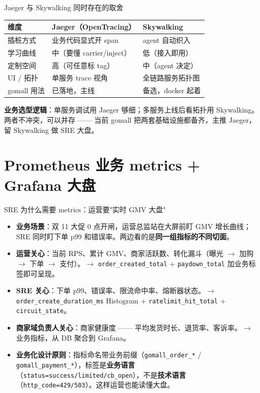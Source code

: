 \documentclass[aspectratio=169,11pt]{beamer}
\begin{document}
\begin{frame}[shrink]{Jaeger 与 Skywalking 同时存在的取舍}
\begin{tabular}{@{}p{2.0cm}p{4.8cm}p{4.0cm}@{}}
\toprule
维度 & Jaeger（OpenTracing） & Skywalking \\
\midrule
插桩方式   & 业务代码显式开 span    & agent 自动织入 \\
学习曲线   & 中（要懂 carrier/inject） & 低（接入即用） \\
定制空间   & 高（可任意标 tag）     & 中（agent 决定） \\
UI / 拓扑 & 单服务 trace 视角     & 全链路服务拓扑图 \\
gomall 用法 & 已落地，主线          & 备选，docker 起着 \\
\bottomrule
\end{tabular}

\medskip
{\small \textbf{业务选型逻辑}：单服务调试用 Jaeger 够细；多服务上线后看拓扑用 Skywalking。两者不冲突，可以并存 —— 当前 gomall 把两套基础设施都备齐，主推 Jaeger，留 Skywalking 做 SRE 大盘。}
\end{frame}

\section{Prometheus 业务 metrics + Grafana 大盘}

\begin{frame}[shrink]{SRE 为什么需要 metrics：运营要"实时 GMV 大盘"}
\begin{itemize}
  \item \textbf{业务场景}：双 11 大促 0 点开闸，运营总监站在大屏前盯 GMV 增长曲线；SRE 同时盯下单 p99 和错误率。两边看的是\textbf{同一组指标的不同切面}。
  \item \textbf{运营关心}：当前 RPS、累计 GMV、商家活跃数、转化漏斗（曝光 $\to$ 加购 $\to$ 下单 $\to$ 支付）。$\to$ \texttt{order\_created\_total} + \texttt{paydown\_total} 加业务标签即可呈现。
  \item \textbf{SRE 关心}：下单 p99、错误率、限流命中率、熔断器状态。$\to$ \texttt{order\_create\_duration\_ms} Histogram + \texttt{ratelimit\_hit\_total} + \texttt{circuit\_state}。
  \item \textbf{商家域负责人关心}：商家健康度 —— 平均发货时长、退货率、客诉率。$\to$ 业务指标，从 DB 聚合到 Grafana。
  \item \textbf{业务化设计原则}：指标命名带业务前缀（\texttt{gomall\_order\_*} / \texttt{gomall\_payment\_*}），标签是\textbf{业务语言}（\texttt{status=success/limited/cb\_open}），不是\textbf{技术语言}（\texttt{http\_code=429/503}）。这样运营也能读懂大盘。
\end{itemize}
\end{frame}
\end{document}
